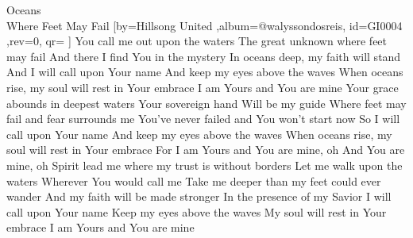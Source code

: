 \beginsong
{Oceans\\Where Feet May Fail %
}[by={Hillsong United  %
},album={@walyssondosreis},
id={GI0004 %
},rev={0}, %
qr={ %
}]
\beginverse
You call me out upon the waters
The great unknown where feet may fail
And there I find You in the mystery
In oceans deep, my faith will stand
\endverse
\beginchorus
And I will call upon Your name
And keep my eyes above the waves
When oceans rise, my soul will rest in Your embrace
I am Yours and You are mine
\endchorus
\beginverse
Your grace abounds in deepest waters
Your sovereign hand
Will be my guide
Where feet may fail and fear surrounds me
You've never failed and You won't start now
\endverse
\beginchorus
So I will call upon Your name
And keep my eyes above the waves
When oceans rise, my soul will rest in Your embrace
For I am Yours and You are mine, oh
And You are mine, oh
\endchorus
\beginverse
Spirit lead me where my trust is without borders
Let me walk upon the waters
Wherever You would call me
Take me deeper than my feet could ever wander
And my faith will be made stronger
In the presence of my Savior
\endverse
\beginchorus
I will call upon Your name
Keep my eyes above the waves
My soul will rest in Your embrace
I am Yours and You are mine
\endchorus

\begin{comment}
\lstset{basicstyle=\scriptsize\bf} %
\tab{Solo 1}
\begin{lstlisting}
E|-----------------------------------------------------|
B|-----------------------------------------------------|
G|-----------------------------------------------------|
D|-----------------------------------------------------|
A|-----------------------------------------------------|
E|-----------------------------------------------------|
\end{lstlisting}
\end{comment}

